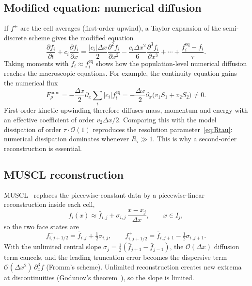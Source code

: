 \documentclass[11pt]{article}
\theoremstyle{remark}
\newcommand{\feq}{f^{\mathrm{eq}}}
\newcommand{\pd}[2]{\frac{\partial #1}{\partial #2}}
\newcommand{\ord}{\mathcal{O}}
\begin{document}
\subsection{Modified equation: numerical diffusion}
\label{sec:modified}
If $f^\pm$ are the cell averages (first-order upwind), a Taylor expansion of the
semi-discrete scheme gives the modified equation~\citep{WarmingHyett1974}
\begin{equation}
  \pd{f_i}{t} + c_i\pd{f_i}{x} = \frac{|c_i|\Delta x}{2}\pd{^2 f_i}{x^2}
    - \frac{c_i\Delta x^2}{6}\pd{^3 f_i}{x^3} + \cdots + \frac{\feq_i - f_i}{\tau}.
\end{equation}
Taking moments with $f_i\approx\feq_i$ shows how the population-level numerical
diffusion reaches the macroscopic equations.  For example, the continuity equation
gains the numerical flux
\begin{equation}
  F_\rho^{\mathrm{num}} = -\frac{\Delta x}{2}\partial_x\sum_i|c_i|\feq_i
  = -\frac{\Delta x}{2}\partial_x\bigl(v_1S_1 + v_2S_2\bigr) \neq 0 .
\end{equation}
First-order kinetic upwinding therefore diffuses mass, momentum and energy with an
effective coefficient of order $v_2\Delta x/2$.  Comparing this with the model
dissipation of order $\tau\cdot\ord(1)$ reproduces the resolution
parameter~\eqref{eq:Rtau}: numerical dissipation dominates whenever $R_\tau\gg1$.
This is why a second-order reconstruction is essential.

\subsection{MUSCL reconstruction}
MUSCL~\citep{vanLeer1979} replaces the piecewise-constant data by a piecewise-linear
reconstruction inside each cell,
\begin{equation}
  f_i(x) \approx \bar f_{i,j} + \sigma_{i,j}\,\frac{x - x_j}{\Delta x},\qquad x\in I_j,
\end{equation}
so the two face states are
\begin{equation}
  f^-_{i,j+1/2} = \bar f_{i,j} + \tfrac12\sigma_{i,j},\qquad
  f^+_{i,j+1/2} = \bar f_{i,j+1} - \tfrac12\sigma_{i,j+1}.
  \label{eq:muscl_faces}
\end{equation}
With the unlimited central slope $\sigma_j = \tfrac12(\bar f_{j+1} - \bar f_{j-1})$, the
$\ord(\Delta x)$ diffusion term cancels, and the leading truncation error becomes the
dispersive term $\ord(\Delta x^2)\,\partial_x^3 f$ (Fromm's scheme).  Unlimited
reconstruction creates new extrema at discontinuities (Godunov's
theorem~\citep{LeVeque2002}), so the slope is limited.
\end{document}
